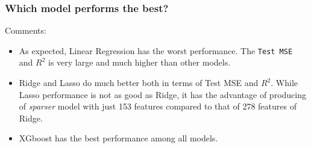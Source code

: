 \documentclass{beamer}
\begin{document}
\begin{frame}
  \frametitle{Which model performs the best?}
    \begin{table}[htpb]
      \centering
      \label{tab:results}

    \end{table}

    Comments:
  \begin{itemize}
      \item As expected, Linear Regression has the worst performance. The
        \texttt{Test MSE} and $R^2$ is very large and much higher than other models.
      \item Ridge and Lasso do much better both in terms of Test MSE and $R^2$.
        While Lasso performance is not as good as Ridge, it has the advantage of
        producing of \textit{sparser} model with just 153 features compared to
        that of 278 features of Ridge.
      \item XGboost has the best performance among all models.
    \end{itemize}
\end{frame}
\end{document}
